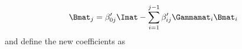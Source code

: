 \begin{equation}
\label{eq:Bnew}
  \Bmat_j = \beta'_{0j} \Imat - \sum_{i=1}^{j-1} \beta'_{ij} \Gammamat_i \Bmat_i
\end{equation}
and define the new coefficients as